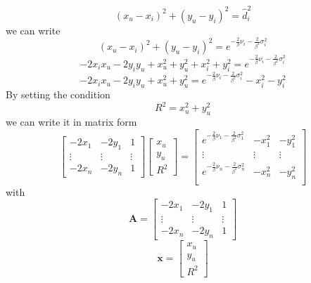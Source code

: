 \documentclass[12pt,twoside]{report}
\begin{document}
\begin{equation}
    (x_u-x_i)^2+(y_u-y_i)^2=\hat{d}_i^2
\end{equation}
we can write
\begin{equation}
    (x_u-x_i)^2+(y_u-y_i)^2=e^{-\frac{2}{\beta}\nu_i-\frac{2}{\beta^2}\sigma^2_i}
\end{equation}
\begin{equation}
    -2x_ix_u-2y_iy_u+x^2_u+y^2_u+x_i^2+y_i^2=e^{-\frac{2}{\beta}\nu_i-\frac{2}{\beta^2}\sigma^2_i}
\end{equation}
\begin{equation}
    -2x_ix_u-2y_iy_u+x_u^2+y_u^2=e^{-\frac{2}{\beta}\nu_i-\frac{2}{\beta^2}\sigma^2_i}-x_i^2-y_i^2
\end{equation}
By setting the condition 
\begin{equation}
R^2=x_u^2+y_u^2    
\label{eq:10}
\end{equation}
we can write it in matrix form
\begin{equation}
    \begin{bmatrix}
        -2x_1 & -2y_1 & 1\\
        \vdots&\vdots&\vdots\\
        -2x_n & -2y_n & 1
    \end{bmatrix}
    \begin{bmatrix}
        x_u\\
        y_u\\
        R^2
    \end{bmatrix} = 
    \begin{bmatrix}
       e^{-\frac{2}{\beta}\nu_1-\frac{2}{\beta^2}\sigma^2_1} & -x_1^2 & -y_1^2\\
        \vdots&\vdots&\vdots\\
        e^{-\frac{2}{\beta}\nu_n-\frac{2}{\beta^2}\sigma^2_n} & -x_n^2 & -y_n^2\\
    \end{bmatrix}
\end{equation}
with $$\mathbf{A}=\begin{bmatrix}
        -2x_1 & -2y_1 & 1\\
        \vdots&\vdots&\vdots\\
        -2x_n & -2y_n & 1
    \end{bmatrix}$$
$$\mathbf{x} =     \begin{bmatrix}
        x_u\\
        y_u\\
        R^2
    \end{bmatrix}$$
\end{document}
